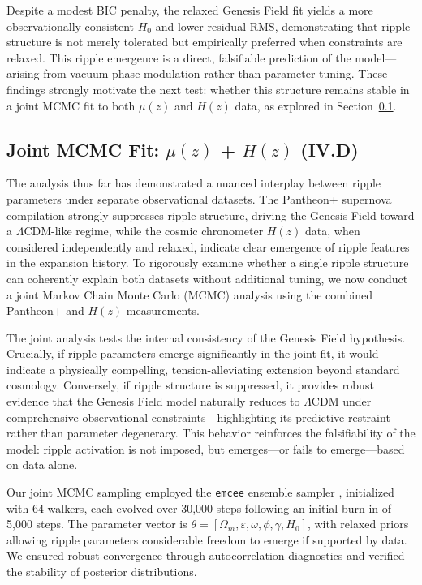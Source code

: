 Despite a modest BIC penalty, the relaxed Genesis Field fit yields a more observationally consistent $H_0$ and lower residual RMS, demonstrating that ripple structure is not merely tolerated but empirically preferred when constraints are relaxed. This ripple emergence is a direct, falsifiable prediction of the model—arising from vacuum phase modulation rather than parameter tuning. These findings strongly motivate the next test: whether this structure remains stable in a joint MCMC fit to both $\mu(z)$ and $H(z)$ data, as explored in Section~\ref{sec:joint_fit}.

\subsection{Joint MCMC Fit: \texorpdfstring{$\mu(z)$ + $H(z)$}{mu(z) + H(z)} (IV.D)}
\label{sec:joint_fit}

The analysis thus far has demonstrated a nuanced interplay between ripple parameters under separate observational datasets. The Pantheon+ supernova compilation strongly suppresses ripple structure, driving the Genesis Field toward a $\Lambda$CDM-like regime, while the cosmic chronometer $H(z)$ data, when considered independently and relaxed, indicate clear emergence of ripple features in the expansion history. To rigorously examine whether a single ripple structure can coherently explain both datasets without additional tuning, we now conduct a joint Markov Chain Monte Carlo (MCMC) analysis using the combined Pantheon+ and $H(z)$ measurements.

The joint analysis tests the internal consistency of the Genesis Field hypothesis. Crucially, if ripple parameters emerge significantly in the joint fit, it would indicate a physically compelling, tension-alleviating extension beyond standard cosmology. Conversely, if ripple structure is suppressed, it provides robust evidence that the Genesis Field model naturally reduces to $\Lambda$CDM under comprehensive observational constraints—highlighting its predictive restraint rather than parameter degeneracy. This behavior reinforces the falsifiability of the model: ripple activation is not imposed, but emerges—or fails to emerge—based on data alone.

Our joint MCMC sampling employed the \texttt{emcee} ensemble sampler \cite{ForemanMackey2013}, initialized with 64 walkers, each evolved over 30,000 steps following an initial burn-in of 5,000 steps. The parameter vector is $\theta = [\Omega_m, \varepsilon, \omega, \phi, \gamma, H_0]$, with relaxed priors allowing ripple parameters considerable freedom to emerge if supported by data. We ensured robust convergence through autocorrelation diagnostics and verified the stability of posterior distributions.

